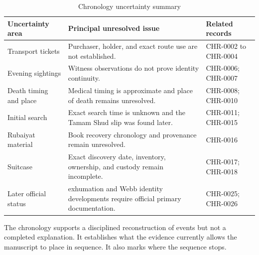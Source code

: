 \begin{table}[htbp]
\centering
\caption{Chronology uncertainty summary}
\label{tab:chronology-uncertainty-summary}
\begin{tabularx}{\textwidth}{>{\RaggedRight\arraybackslash}p{}>{\RaggedRight\arraybackslash}X >{\RaggedRight\arraybackslash}p{}}
\toprule
Uncertainty area & Principal unresolved issue & Related records \\
\midrule
Transport tickets & Purchaser, holder, and exact route use are not established. & CHR-0002 to CHR-0004 \\
Evening sightings & Witness observations do not prove identity continuity. & CHR-0006; CHR-0007 \\
Death timing and place & Medical timing is approximate and place of death remains unresolved. & CHR-0008; CHR-0010 \\
Initial search & Exact search time is unknown and the Tamam Shud slip was found later. & CHR-0011; CHR-0015 \\
Rubaiyat material & Book recovery chronology and provenance remain unresolved. & CHR-0016 \\
Suitcase & Exact discovery date, inventory, ownership, and custody remain incomplete. & CHR-0017; CHR-0018 \\
Later official status & 2021 exhumation and Webb identity developments require official primary documentation. & CHR-0025; CHR-0026 \\
\bottomrule
\end{tabularx}
\end{table}

The chronology supports a disciplined reconstruction of events but not a completed explanation. It establishes what the evidence currently allows the manuscript to place in sequence. It also marks where the sequence stops.
